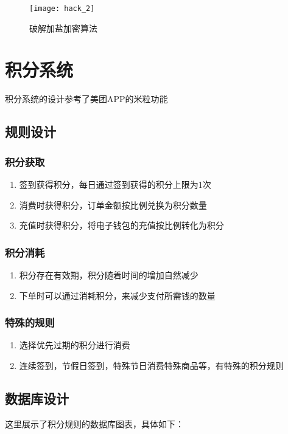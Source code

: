 \begin{figure}[htbp]
	\centering
	\texttt{[image: hack\_2]}
	\caption{破解加盐加密算法}
	\label{fig:hack_2}
	\vspace{\baselineskip}
\end{figure}


\section{积分系统}
积分系统的设计参考了美团APP的米粒功能
\subsection{规则设计}
\subsubsection{积分获取}
\begin{enumerate}
	\item 签到获得积分，每日通过签到获得的积分上限为1次
	\item 消费时获得积分，订单金额按比例兑换为积分数量
	\item 充值时获得积分，将电子钱包的充值按比例转化为积分
\end{enumerate}
\subsubsection{积分消耗}
\begin{enumerate}
	\item 积分存在有效期，积分随着时间的增加自然减少
	\item 下单时可以通过消耗积分，来减少支付所需钱的数量
\end{enumerate}
\subsubsection{特殊的规则}
\begin{enumerate}
	\item 选择优先过期的积分进行消费
	\item 连续签到，节假日签到，特殊节日消费特殊商品等，有特殊的积分规则
\end{enumerate}

\subsection{数据库设计}

这里展示了积分规则的数据库图表，具体如下：

